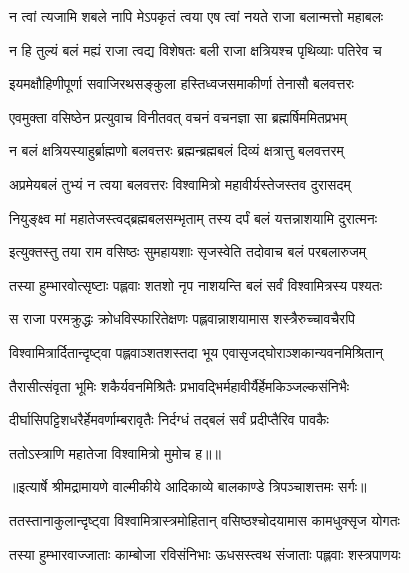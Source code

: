 \twolineshloka
{न त्वां त्यजामि शबले नापि मेऽपकृतं त्वया}
{एष त्वां नयते राजा बलान्मत्तो महाबलः} %

\twolineshloka
{न हि तुल्यं बलं मह्यं राजा त्वद्य विशेषतः}
{बली राजा क्षत्रियश्च पृथिव्याः पतिरेव च} %

\twolineshloka
{इयमक्षौहिणीपूर्णा सवाजिरथसङ्कुला}
{हस्तिध्वजसमाकीर्णा तेनासौ बलवत्तरः} %

\twolineshloka
{एवमुक्ता वसिष्ठेन प्रत्युवाच विनीतवत्}
{वचनं वचनज्ञा सा ब्रह्मर्षिममितप्रभम्} %

\twolineshloka
{न बलं क्षत्रियस्याहुर्ब्राह्मणो बलवत्तरः}
{ब्रह्मन्ब्रह्मबलं दिव्यं क्षत्रात्तु बलवत्तरम्} %

\twolineshloka
{अप्रमेयबलं तुभ्यं न त्वया बलवत्तरः}
{विश्वामित्रो महावीर्यस्तेजस्तव दुरासदम्} %

\twolineshloka
{नियुङ्क्ष्व मां महातेजस्त्वद्ब्रह्मबलसम्भृताम्}
{तस्य दर्पं बलं यत्तन्नाशयामि दुरात्मनः} %

\twolineshloka
{इत्युक्तस्तु तया राम वसिष्ठः सुमहायशाः}
{सृजस्वेति तदोवाच बलं परबलारुजम्} %

\twolineshloka
{तस्या हुम्भारवोत्सृष्टाः पह्लवाः शतशो नृप}
{नाशयन्ति बलं सर्वं विश्वामित्रस्य पश्यतः} %

\twolineshloka
{स राजा परमक्रुद्धः क्रोधविस्फारितेक्षणः}
{पह्लवान्नाशयामास शस्त्रैरुच्चावचैरपि} %

\twolineshloka
{विश्वामित्रार्दितान्दृष्ट्वा पह्लवाञ्शतशस्तदा}
{भूय एवासृजद्घोराञ्शकान्यवनमिश्रितान्} %

\twolineshloka
{तैरासीत्संवृता भूमिः शकैर्यवनमिश्रितैः}
{प्रभावद्भिर्महावीर्यैर्हेमकिञ्जल्कसंनिभैः} %

\twolineshloka
{दीर्घासिपट्टिशधरैर्हेमवर्णाम्बरावृतैः}
{निर्दग्धं तद्बलं सर्वं प्रदीप्तैरिव पावकैः} %

{ततोऽस्त्राणि महातेजा विश्वामित्रो मुमोच ह॥॥} %

\addtocounter{shlokacount}{1}


{॥इत्यार्षे श्रीमद्रामायणे वाल्मीकीये आदिकाव्ये बालकाण्डे त्रिपञ्चाशत्तमः सर्गः॥}


\twolineshloka
{ततस्तानाकुलान्दृष्ट्वा विश्वामित्रास्त्रमोहितान्}
{वसिष्ठश्चोदयामास कामधुक्सृज योगतः} %

\twolineshloka
{तस्या हुम्भारवाज्जाताः काम्बोजा रविसंनिभाः}
{ऊधसस्त्वथ संजाताः पह्लवाः शस्त्रपाणयः} %


